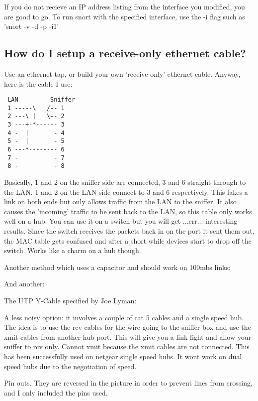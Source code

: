 \documentclass{article}
\begin{document}
If you do not recieve an IP address listing from the interface you
modified, you are good to go.  To run snort with the specified interface,
use the -i flag such as 'snort -v -d -p -i1'
 
\subsection{How do I setup a receive-only ethernet cable?}

Use an ethernet tap, or build your own 'receive-only' ethernet cable.
Anyway, here is the cable I use: 

\begin{verbatim}
 LAN         Sniffer 
 1 -----\   /-- 1
 2 ---\ |   \-- 2
 3 ---+-*------ 3
 4 -  |       - 4
 5 -  |       - 5
 6 ---*-------- 6
 7 -          - 7
 8 -          - 8
\end{verbatim}

Basically, 1 and 2 on the sniffer side are connected, 3 and 6 
straight through to the LAN. 1 and 2 on the LAN side connect to 3 and 
6 respectively. This fakes a link on both ends but only allows 
traffic from the LAN to the sniffer. It also causes the 'incoming' 
traffic to be sent back to the LAN, so this cable only works well on 
a hub. You can use it on a switch but you will get ...err... 
interesting results. Since the switch receives the packets back in on 
the port it sent them out, the MAC table gets confused and after a 
short while devices start to drop off the switch. Works like a charm 
on a hub though. 

Another method which uses a capacitor and should work on 100mbs links:


And another:

    The UTP Y-Cable specified by Joe Lyman:

A less noisy option: it involves a couple of cat 5 cables and a single speed
hub. The idea is to use the rcv cables for the wire going to the sniffer box
and use the xmit cables from another hub port. This will give you a link light
and allow your sniffer to rcv only. Cannot xmit because the xmit cables are not
connected. This has been successfully used on netgear single speed hubs. It
wont work on dual speed hubs due to the negotiation of speed.

Pin outs. They are reversed in the picture in order to prevent lines from
crossing, and I only included the pins used.
\end{document}
